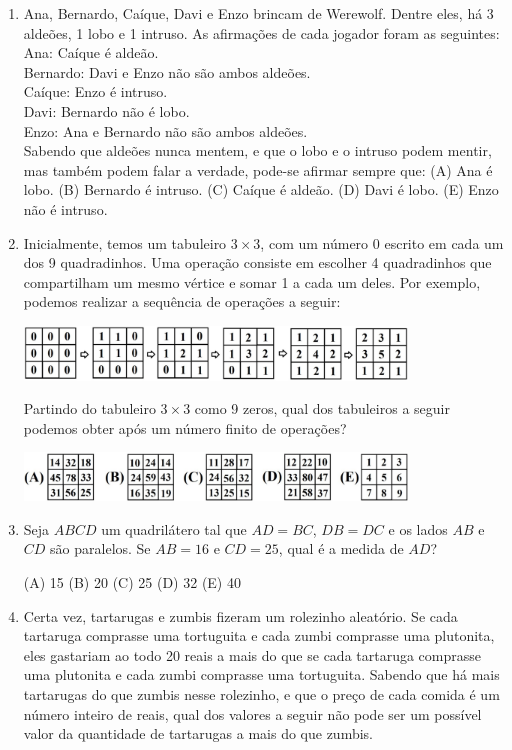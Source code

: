 \documentclass[12pt]{article}
\begin{document}
\begin{enumerate}[label=\textbf{{\arabic*.}}]
\item Ana, Bernardo, Caíque, Davi e Enzo brincam de Werewolf. Dentre eles, há 3 aldeões, 1 lobo e 1 intruso. As afirmações de cada jogador foram as seguintes: \\
Ana: Caíque é aldeão. \\
Bernardo: Davi e Enzo não são ambos aldeões. \\
Caíque: Enzo é intruso. \\
Davi: Bernardo não é lobo. \\
Enzo: Ana e Bernardo não são ambos aldeões. \\
Sabendo que aldeões nunca mentem, e que o lobo e o intruso podem mentir, mas também podem falar a verdade, pode-se afirmar sempre que:
(A) Ana é lobo. (B) Bernardo é intruso. (C) Caíque é aldeão. (D) Davi é lobo. (E) Enzo não é intruso.

\item Inicialmente, temos um tabuleiro $3\times 3$, com um número $0$ escrito em cada um dos 9 quadradinhos. Uma operação consiste em escolher 4 quadradinhos que compartilham um mesmo vértice e somar 1 a cada um deles. Por exemplo, podemos realizar a sequência de operações a seguir:

      \begin{center}
    \includegraphics[width=0.8\textwidth]{fifth.png}
  \end{center}


Partindo do tabuleiro $3\times 3$ como 9 zeros, qual dos tabuleiros a seguir podemos obter após um número finito de operações?
    \begin{center}
    \includegraphics[width=0.8\textwidth]{sixth.png}
  \end{center}


\item Seja $ABCD$ um quadrilátero tal que $AD = BC$, $DB = DC$ e os lados $AB$ e $CD$ são paralelos. Se $AB = 16$ e $CD = 25$, qual é a medida de $AD$?

(A) 15 (B) 20 (C) 25 (D) 32 (E) 40

\item Certa vez, tartarugas e zumbis fizeram um rolezinho aleatório. Se cada tartaruga comprasse uma tortuguita e cada zumbi comprasse uma plutonita, eles gastariam ao todo 20 reais a mais do que se cada tartaruga comprasse uma plutonita e cada zumbi comprasse uma tortuguita. Sabendo que há mais tartarugas do que zumbis nesse rolezinho, e que o preço de cada comida é um número inteiro de reais, qual dos valores a seguir não pode ser um possível valor da quantidade de tartarugas a mais do que zumbis.


\end{enumerate}
\end{document}
